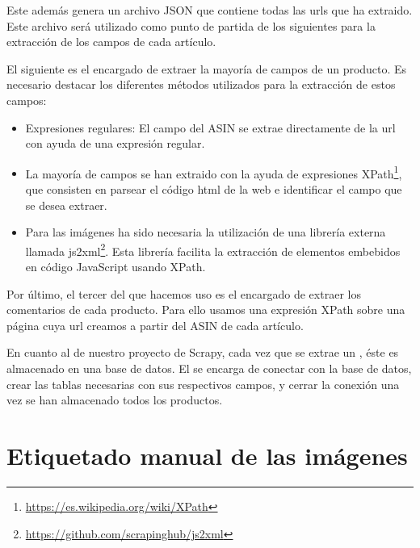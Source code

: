 Este  además genera un archivo JSON que contiene todas las urls que ha extraido. Este archivo será utilizado como punto de partida de los siguientes  para la extracción de los campos de cada artículo.


El siguiente  es el encargado de extraer la mayoría de campos de un producto. Es necesario destacar los diferentes métodos utilizados para la extracción de estos campos:

\begin{itemize}
    \item Expresiones regulares: El campo del ASIN se extrae directamente  de la url con ayuda de una expresión regular.
    \item La mayoría de campos se han extraido con la ayuda de expresiones XPath\footnote{\url{https://es.wikipedia.org/wiki/XPath}}, que consisten en parsear el código html de la web e identificar el campo que se desea extraer.
    \item Para las imágenes ha sido necesaria la utilización de una librería externa llamada js2xml\footnote{\url{https://github.com/scrapinghub/js2xml}}. Esta librería facilita la extracción de elementos embebidos en código JavaScript usando XPath.
\end{itemize}


Por último, el tercer  del que hacemos uso es el encargado de extraer los comentarios de cada producto. Para ello usamos una expresión XPath sobre una página cuya url creamos a partir del ASIN de cada artículo.


En cuanto al  de nuestro proyecto de Scrapy, cada vez que se extrae un , éste es almacenado en una base de datos. El  se encarga de conectar con la base de datos, crear las tablas necesarias con sus respectivos campos, y cerrar la conexión una vez se han almacenado todos los productos.


\section{Etiquetado manual de las imágenes}

